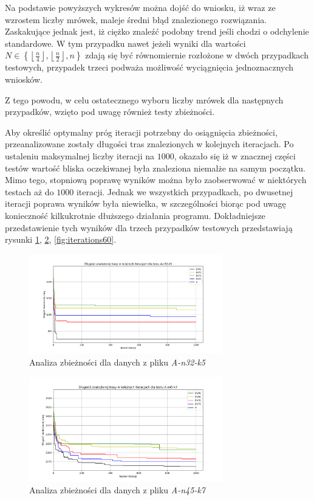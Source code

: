 \documentclass[10pt]{article}
\begin{document}
Na podstawie powyższych wykresów można dojść do wniosku, iż wraz ze wzrostem liczby mrówek, maleje średni błąd znalezionego rozwiązania. Zaskakujące jednak jest, iż ciężko znaleźć podobny trend jeśli chodzi o odchylenie standardowe. W tym przypadku nawet jeżeli wyniki dla wartości $N \in \left\{ \left\lfloor\frac{n}{4}\right\rfloor, \left\lfloor\frac{n}{2}\right\rfloor, n \right\}$ zdają się być równomiernie rozłożone w dwóch przypadkach testowych, przypadek trzeci podważa możliwość wyciągnięcia jednoznacznych wniosków.

Z tego powodu, w celu ostatecznego wyboru liczby mrówek dla następnych przypadków, wzięto pod uwagę również testy zbieżności.

Aby określić optymalny próg iteracji potrzebny do osiągnięcia zbieżności, przeanalizowane zostały długości tras znalezionych w kolejnych iteracjach. Po ustaleniu maksymalnej liczby iteracji na $1000$, okazało się iż w znacznej części testów wartość bliska oczekiwanej była znaleziona niemalże na samym początku. Mimo tego, stopniową poprawę wyników można było zaobserwować w niektórych testach aż do $1000$ iteracji. Jednak we wszystkich przypadkach, po dwusetnej iteracji poprawa wyników była niewielka, w szczególności biorąc pod uwagę konieczność kilkukrotnie dłuższego działania programu. Dokładniejsze przedstawienie tych wyników dla trzech przypadków testowych przedstawiają rysunki \ref{fig:iterations32}, \ref{fig:iterations45}, \ref{fig:iterations60}.

\begin{figure}[H]
    \centering
    \includegraphics[width=0.75\textwidth]{iterations_32.png}
    \caption{Analiza zbieżności dla danych z pliku \textit{A-n32-k5}}
    \label{fig:iterations32}
\end{figure}

\begin{figure}[H]
    \centering
    \includegraphics[width=0.75\textwidth]{iterations_45.png}
    \caption{Analiza zbieżności dla danych z pliku \textit{A-n45-k7}}
    \label{fig:iterations45}
\end{figure}
\end{document}
